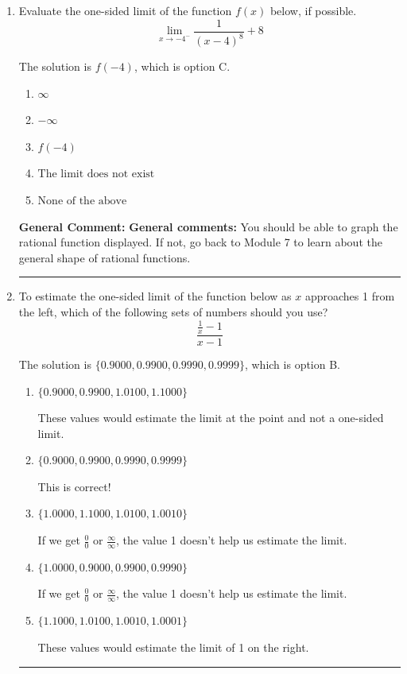 \documentclass{extbook}[14pt]
\newcommand{\litem}[1]{\item #1

\rule{\textwidth}{0.4pt}}
\begin{document}
\begin{enumerate}\litem{
Evaluate the one-sided limit of the function $f(x)$ below, if possible.
\[ \lim_{x \rightarrow -4^-} \frac{1}{(x-4)^8}+8 \]

The solution is \( f(-4) \), which is option C.\begin{enumerate}[label=\Alph*.]
\item \( \infty \)


\item \( -\infty \)


\item \( f(-4) \)


\item \( \text{The limit does not exist} \)


\item \( \text{None of the above} \)


\end{enumerate}

\textbf{General Comment:} \textbf{General comments:} You should be able to graph the rational function displayed. If not, go back to Module 7 to learn about the general shape of rational functions.
}
\litem{
To estimate the one-sided limit of the function below as $x$ approaches 1 from the left, which of the following sets of numbers should you use?
\[ \frac{\frac{1}{x} - 1}{x - 1} \]

The solution is \( \{ 0.9000, 0.9900, 0.9990, 0.9999 \} \), which is option B.\begin{enumerate}[label=\Alph*.]
\item \( \{ 0.9000, 0.9900, 1.0100, 1.1000 \} \)

These values would estimate the limit at the point and not a one-sided limit.
\item \( \{ 0.9000, 0.9900, 0.9990, 0.9999 \} \)

This is correct!
\item \( \{ 1.0000, 1.1000, 1.0100, 1.0010 \} \)

If we get $\frac{0}{0}$ or $\frac{\infty}{\infty}$, the value 1 doesn't help us estimate the limit.
\item \( \{ 1.0000, 0.9000, 0.9900, 0.9990 \} \)

If we get $\frac{0}{0}$ or $\frac{\infty}{\infty}$, the value 1 doesn't help us estimate the limit.
\item \( \{ 1.1000, 1.0100, 1.0010, 1.0001 \} \)

These values would estimate the limit of 1 on the right.
\end{enumerate}

}
\end{enumerate}
\end{document}
